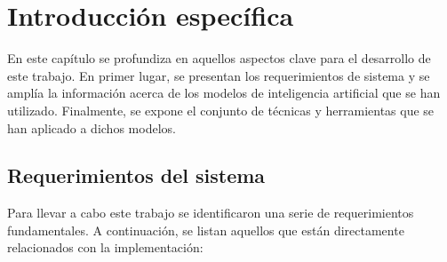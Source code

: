 \chapter{Introducción específica} %

\label{Chapter2}

En este capítulo se profundiza en aquellos aspectos clave para el desarrollo de este trabajo.
En primer lugar, se presentan los requerimientos de sistema y se amplía la información acerca de los modelos de 
inteligencia artificial que se han utilizado.
Finalmente, se expone el conjunto de técnicas y herramientas que se han aplicado a dichos modelos.

\section{Requerimientos del sistema}
Para llevar a cabo este trabajo
se identificaron una serie de requerimientos fundamentales.
A continuación, se listan aquellos que están directamente relacionados con la implementación:

